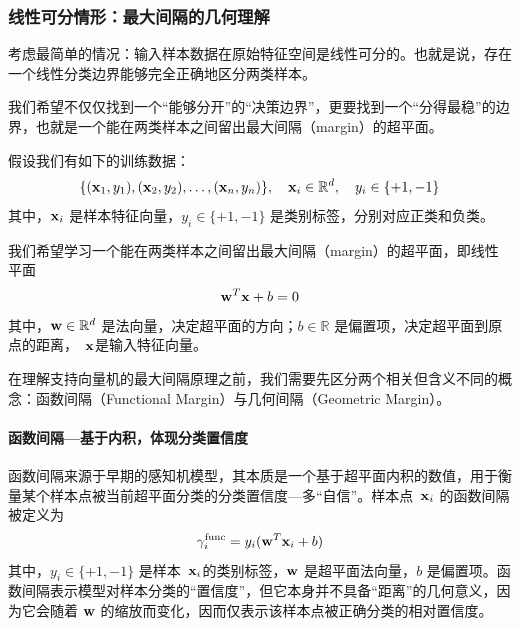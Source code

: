 \subsubsection{线性可分情形：最大间隔的几何理解}

考虑最简单的情况：输入样本数据在原始特征空间是线性可分的。也就是说，存在一个线性分类边界能够完全正确地区分两类样本。

我们希望不仅仅找到一个“能够分开”的“决策边界”，更要找到一个“分得最稳”的边界，也就是一个能在两类样本之间留出最大间隔（margin）的超平面。

假设我们有如下的训练数据：
\[
\{({\bf x}_1, y_1), ({\bf x}_2, y_2), \dots, ({\bf x}_n, y_n)\}, \quad {\bf x}_i \in \mathbb{R}^d, \quad y_i \in \{+1, -1\}
\]
其中，${\bf x}_i$ 是样本特征向量，$y_i\in \{+1, -1\}$ 是类别标签，分别对应正类和负类。

我们希望学习一个能在两类样本之间留出最大间隔（margin）的超平面，即线性平面
\begin{equation}\label{hyper_plane}
{\bf w}^T {\bf x} + b  = 0
\end{equation}
其中，${\bf w} \in \mathbb{R}^d$ 是法向量，决定超平面的方向；$b \in \mathbb{R}$ 是偏置项，决定超平面到原点的距离，~${\bf x}$是输入特征向量。



在理解支持向量机的最大间隔原理之前，我们需要先区分两个相关但含义不同的概念：函数间隔（Functional Margin）与几何间隔（Geometric Margin）。

\paragraph*{函数间隔---基于内积，体现分类置信度}

函数间隔来源于早期的感知机模型，其本质是一个基于超平面内积的数值，用于衡量某个样本点被当前超平面分类的分类置信度---多“自信”。样本点~${\bf x}_i$ 的函数间隔被定义为
\begin{equation}\label{eq:func_margin}
\gamma_i^{\text{func}} = y_i({\bf w}^T {\bf x}_i + b )
\end{equation}
其中，$y_i \in \{+1, -1\}$ 是样本~${\bf x}_i$的类别标签，${\bf w}$ 是超平面法向量，$b$ 是偏置项。函数间隔表示模型对样本分类的“置信度”，但它本身并不具备“距离”的几何意义，因为它会随着 ${\bf w}$ 的缩放而变化，因而仅表示该样本点被正确分类的相对置信度。

